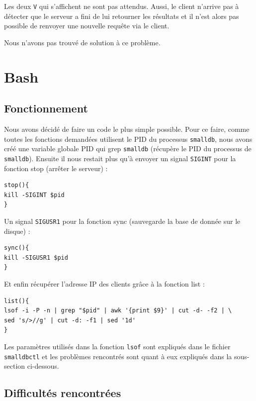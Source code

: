 \documentclass[utf8]{article}
\begin{document}
Les deux \texttt{V} qui s'affichent ne sont pas attendus. Aussi, le client n'arrive pas à détecter que le serveur a fini de lui retourner les résultats et il n'est alors pas possible de renvoyer une nouvelle requête via le client.

Nous n'avons pas trouvé de solution à ce problème.


\section{Bash}

\subsection{Fonctionnement}

Nous avons décidé de faire un code le plus simple possible. Pour ce faire, comme toutes les fonctions demandées utilisent le PID du processus \texttt{smalldb}, nous avons créé une variable globale PID qui grep \texttt{smalldb} (récupère le PID du processus de \texttt{smalldb}). Ensuite il nous restait plus qu'à envoyer un signal \texttt{SIGINT} pour la fonction stop (arrêter le serveur) :

\begin{lstlisting}
stop(){
kill -SIGINT $pid
}
\end{lstlisting}

Un signal \texttt{SIGUSR1} pour la fonction sync (sauvegarde la base de donnée sur le disque) :

\begin{lstlisting}
sync(){
kill -SIGUSR1 $pid
}
\end{lstlisting}

Et enfin récupérer l'adresse IP des clients grâce à la fonction list : 

\begin{lstlisting}
list(){
lsof -i -P -n | grep "$pid" | awk '{print $9}' | cut -d- -f2 | \
sed 's/>//g' | cut -d: -f1 | sed '1d'
}
\end{lstlisting}

Les paramètres utilisés dans la fonction \texttt{lsof} sont expliqués dans le fichier \texttt{smalldbctl} et les problèmes rencontrés sont quant à eux expliqués dans la sous-section ci-dessous.

\subsection{Difficultés rencontrées}
\end{document}
